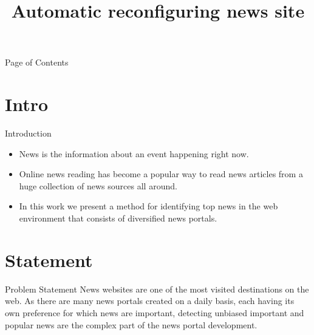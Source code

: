 \documentclass{beamer}
\title{Automatic reconfiguring news site}
\begin{document}
	\begin{frame}{Page of Contents}
		\tableofcontents
	\end{frame}
	\section{Intro}
	\begin{frame}{Introduction}
		\begin{itemize}
			\item  News is the information about an event happening right now.
			\item Online news reading has become a popular way to read news articles from a huge collection of news sources all around.
			\item In this work we present a method for identifying top news in the web environment that consists of diversiﬁed news portals. 
		\end{itemize}
	\end{frame}
	\section{Statement}
	\begin{frame}{Problem Statement}
		 News websites are one of the most visited destinations on the web. As there are many news portals created on a daily basis, each having its own preference for which news are important, detecting unbiased important and popular news are the complex part of the news portal development.
	\end{frame}
\end{document}
